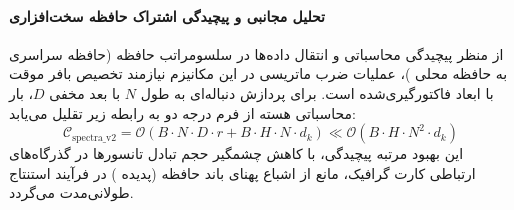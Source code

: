 \paragraph{تحلیل مجانبی و پیچیدگی اشتراک حافظه سخت‌افزاری}
از منظر پیچیدگی محاسباتی و انتقال داده‌ها در سلسومراتب حافظه (حافظه سراسری  به حافظه محلی )، عملیات ضرب ماتریسی در این مکانیزم نیازمند تخصیص بافر موقت با ابعاد فاکتورگیری‌شده است. برای پردازش دنباله‌ای به طول $N$ با بعد مخفی $D$، بار محاسباتی هسته از فرم درجه دو به رابطه زیر تقلیل می‌یابد:
\begin{equation}
\label{eq:complexity_spectra_v2}
\mathcal{C}_{\text{spectra\_v2}} = \mathcal{O}\left( B \cdot N \cdot D \cdot r + B \cdot H \cdot N \cdot d_k \right) \ll \mathcal{O}\left( B \cdot H \cdot N^2 \cdot d_k \right)
\end{equation}
این بهبود مرتبه پیچیدگی، با کاهش چشمگیر حجم تبادل تانسورها در گذرگاه‌های ارتباطی کارت گرافیک، مانع از اشباع پهنای باند حافظه (پدیده ) در فرآیند استنتاج طولانی‌مدت می‌گردد.